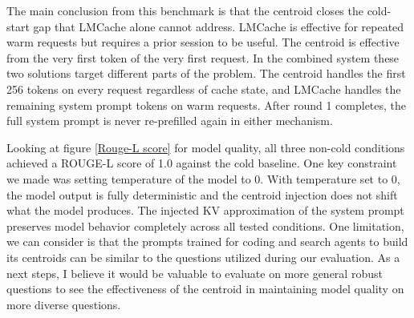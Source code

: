 \documentclass[letterpaper,twocolumn,10pt]{article}
\begin{document}
The main conclusion from this benchmark is that the centroid closes the cold-start gap that LMCache alone cannot address. LMCache is effective for repeated warm requests but requires a prior session to be useful. The centroid is effective from the very first token of the very first request. In the combined system these two solutions target different parts of the problem. The centroid handles the first 256 tokens on every request regardless of cache state, and LMCache handles the remaining system prompt tokens on warm requests. After round 1 completes, the full system prompt is never re-prefilled again in either mechanism.

Looking at figure \ref{Rouge-L score} for model quality, all three non-cold conditions achieved a ROUGE-L score of 1.0 against the cold baseline. One key constraint we made was setting temperature of the model to 0. With temperature set to 0, the model output is fully deterministic and the centroid injection does not shift what the model produces. The injected KV approximation of the system prompt preserves model behavior completely across all tested conditions. One limitation, we can consider is that the prompts trained for coding and search agents to build its centroids can be similar to the questions utilized during our evaluation. As a next steps, I believe it would be valuable to evaluate on more general robust questions to see the effectiveness of the centroid in maintaining model quality on more diverse questions.





{\footnotesize 
}
\end{document}
